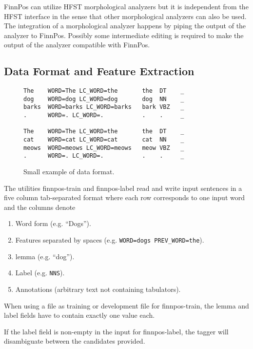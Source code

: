\documentclass{llncs}
\begin{document}
FinnPos can utilize HFST morphological analyzers but it is independent
from the HFST interface in the sense that other morphological
analyzers can also be used. The integration of a morphological
analyzer happens by piping the output of the analyzer to
FinnPos. Possibly some intermediate editing is required to make the
output of the analyzer compatible with FinnPos.

\subsection{Data Format and Feature Extraction}

\begin{figure}
\begin{framed}
\begin{verbatim}
The    WORD=The LC_WORD=the       the  DT    _
dog    WORD=dog LC_WORD=dog       dog  NN    _
barks  WORD=barks LC_WORD=barks   bark VBZ   _
.      WORD=. LC_WORD=.           .    .     _

The    WORD=The LC_WORD=the       the  DT    _
cat    WORD=cat LC_WORD=cat       cat  NN    _
meows  WORD=meows LC_WORD=meows   meow VBZ   _
.      WORD=. LC_WORD=.           .    .     _
\end{verbatim}
\end{framed}
\caption{Small example of data format.}
\end{figure}

The utilities finnpos-train and finnpos-label read and write input
sentences in a five column tab-separated format where each row
corresponds to one input word and the columns denote

\begin{enumerate}
  \item  Word form (e.g. ``Dogs'').
  \item  Features separated by spaces (e.g. \verb|WORD=dogs PREV_WORD=the|).
  \item  lemma (e.g. ``dog'').
  \item  Label (e.g. \verb|NNS|).
  \item  Annotations (arbitrary text not containing tabulators).
\end{enumerate}

When using a file as training or development file for finnpos-train, the lemma and label fields have to contain exactly one value each.

If the label field is non-empty in the input for finnpos-label, the tagger will disambiguate between the candidates provided.
\end{document}
